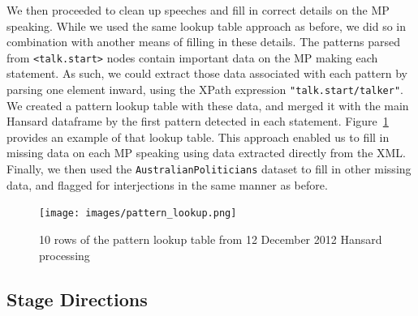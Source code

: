 \documentclass[
  letterpaper,
  DIV=11,
  numbers=noendperiod]{scrartcl}
\begin{document}
We then proceeded to clean up speeches and fill in correct details on
the MP speaking. While we used the same lookup table approach as before,
we did so in combination with another means of filling in these details.
The patterns parsed from \texttt{\textless{}talk.start\textgreater{}}
nodes contain important data on the MP making each statement. As such,
we could extract those data associated with each pattern by parsing one
element inward, using the XPath expression \texttt{"talk.start/talker"}.
We created a pattern lookup table with these data, and merged it with
the main Hansard dataframe by the first pattern detected in each
statement. Figure~\ref{fig-patterns} provides an example of that lookup
table. This approach enabled us to fill in missing data on each MP
speaking using data extracted directly from the XML. Finally, we then
used the \texttt{AustralianPoliticians} dataset to fill in other missing
data, and flagged for interjections in the same manner as before.

\begin{figure}

{\centering \texttt{[image: images/pattern\_lookup.png]}

}

\caption{\label{fig-patterns}10 rows of the pattern lookup table from 12
December 2012 Hansard processing}

\end{figure}

\hypertarget{sec-stage}{%
\subsection{Stage Directions}\label{sec-stage}}
\end{document}
